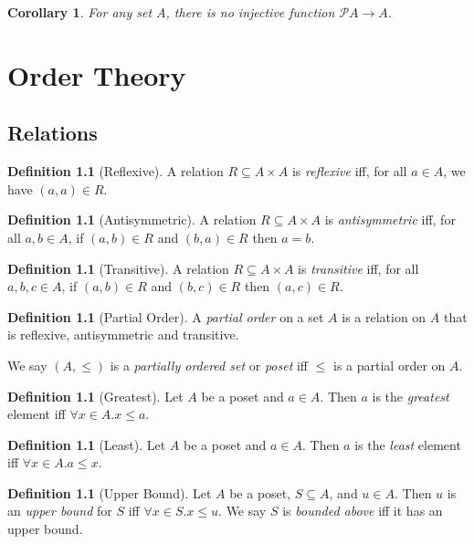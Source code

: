 \documentclass{book}
\newtheorem{cor}{Corollary}[ax]
\theoremstyle{definition}
\newtheorem{df}[ax]{Definition}
\begin{document}
\begin{cor}
For any set $A$, there is no injective function $\mathcal{P} A \rightarrow A$.
\end{cor}

\chapter{Order Theory}

\section{Relations}

\begin{df}[Reflexive]
A relation $R \subseteq A \times A$ is \emph{reflexive} iff, for all $a \in A$, we have $(a,a) \in R$.
\end{df}

\begin{df}[Antisymmetric]
A relation $R \subseteq A \times A$ is \emph{antisymmetric} iff, for all $a,b \in A$, if $(a,b) \in R$ and $(b,a) \in R$ then $a = b$.
\end{df}

\begin{df}[Transitive]
A relation $R \subseteq A \times A$ is \emph{transitive} iff, for all $a,b,c \in A$, if $(a,b) \in R$ and $(b,c) \in R$ then $(a,c) \in R$.
\end{df}

\begin{df}[Partial Order]
A \emph{partial order} on a set $A$ is a relation on $A$ that is reflexive, antisymmetric and transitive.

We say $(A, \leq)$ is a \emph{partially ordered set} or \emph{poset} iff $\leq$ is a partial order on $A$.
\end{df}

\begin{df}[Greatest]
Let $A$ be a poset and $a \in A$. Then $a$ is the \emph{greatest} element iff $\forall x \in A. x \leq a$.
\end{df}

\begin{df}[Least]
Let $A$ be a poset and $a \in A$. Then $a$ is the \emph{least} element iff $\forall x \in A. a \leq x$.
\end{df}

\begin{df}[Upper Bound]
Let $A$ be a poset, $S \subseteq A$, and $u \in A$. Then $u$ is an \emph{upper bound} for $S$ iff $\forall x \in S. x \leq u$. We say $S$ is \emph{bounded above} iff it has an upper bound.
\end{df}
\end{document}
